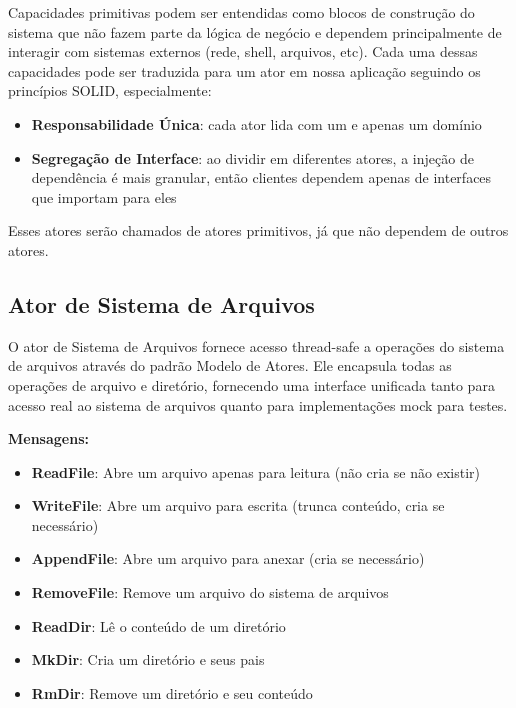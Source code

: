 Capacidades primitivas podem ser entendidas como blocos de construção do sistema que não fazem parte da lógica de negócio e dependem principalmente de interagir com sistemas externos (rede, shell, arquivos, etc). Cada uma dessas capacidades pode ser traduzida para um ator em nossa aplicação seguindo os princípios SOLID, especialmente:

\begin{itemize}
    \item \textbf{Responsabilidade Única}: cada ator lida com um e apenas um domínio
    \item \textbf{Segregação de Interface}: ao dividir em diferentes atores, a injeção de dependência é mais granular, então clientes dependem apenas de interfaces que importam para eles
\end{itemize}

Esses atores serão chamados de atores primitivos, já que não dependem de outros atores.

\subsection{Ator de Sistema de Arquivos}

O ator de Sistema de Arquivos fornece acesso thread-safe a operações do sistema de arquivos através do padrão Modelo de Atores. Ele encapsula todas as operações de arquivo e diretório, fornecendo uma interface unificada tanto para acesso real ao sistema de arquivos quanto para implementações mock para testes.

\textbf{Mensagens:}

\begin{itemize}
    \item \textbf{ReadFile}: Abre um arquivo apenas para leitura (não cria se não existir)
    \item \textbf{WriteFile}: Abre um arquivo para escrita (trunca conteúdo, cria se necessário)
    \item \textbf{AppendFile}: Abre um arquivo para anexar (cria se necessário)
    \item \textbf{RemoveFile}: Remove um arquivo do sistema de arquivos
    \item \textbf{ReadDir}: Lê o conteúdo de um diretório
    \item \textbf{MkDir}: Cria um diretório e seus pais
    \item \textbf{RmDir}: Remove um diretório e seu conteúdo
\end{itemize}

